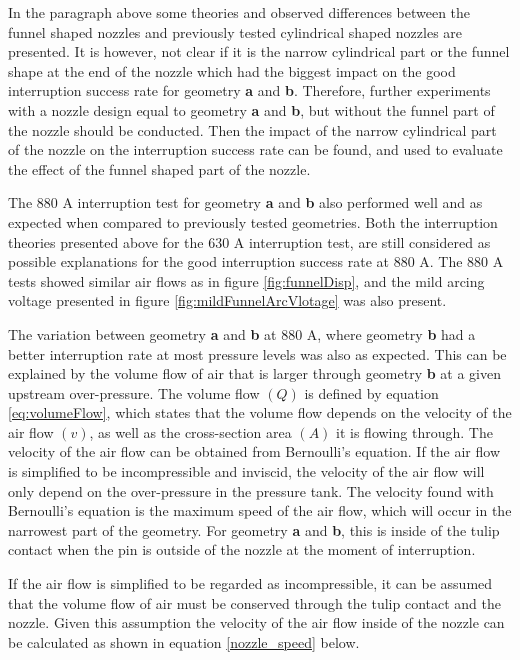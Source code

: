 \documentclass[10pt,b5paper,twoside]{article}
\begin{document}
In the paragraph above some theories and observed differences between the funnel shaped nozzles and previously tested cylindrical shaped nozzles are presented. It is however, not clear if it is the narrow cylindrical part or the funnel shape at the end of the nozzle which had the biggest impact on the good interruption success rate for geometry \textbf{a} and \textbf{b}. Therefore, further experiments with a nozzle design equal to geometry \textbf{a} and \textbf{b}, but without the funnel part of the nozzle should be conducted. Then the impact of the narrow cylindrical part of the nozzle on the interruption success rate can be found, and used to evaluate the effect of the funnel shaped part of the nozzle. 

The 880 A interruption test for geometry \textbf{a} and \textbf{b} also performed well and as expected when compared to previously tested geometries. Both the interruption theories presented above for the 630 A interruption test, are still considered as possible explanations for the good interruption success rate at 880 A. The 880 A tests showed similar air flows as in figure \ref{fig:funnelDisp}, and the mild arcing voltage presented in figure \ref{fig:mildFunnelArcVlotage} was also present.

The variation between geometry \textbf{a} and \textbf{b} at 880 A, where geometry \textbf{b} had a better interruption rate at most pressure levels was also as expected. This can be explained by the volume flow of air that is larger through geometry \textbf{b} at a given upstream over-pressure. The volume flow $(Q)$ is defined by equation \eqref{eq:volumeFlow}, which states that the volume flow depends on the velocity of the air flow $(v)$, as well as the cross-section area $(A)$ it is flowing through. The velocity of the air flow can be obtained from Bernoulli's equation. If the air flow is simplified to be incompressible and inviscid, the velocity of the air flow will only depend on the over-pressure in the pressure tank. The velocity found with Bernoulli's equation is the maximum speed of the air flow, which will occur in the narrowest part of the geometry. For geometry \textbf{a} and \textbf{b}, this is inside of the tulip contact when the pin is outside of the nozzle at the moment of interruption.

If the air flow is simplified to be regarded as incompressible, it can be assumed that the volume flow of air must be conserved through the tulip contact and the nozzle. Given this assumption the velocity of the air flow inside of the nozzle can be calculated as shown in equation \eqref{nozzle_speed} below.
\end{document}

